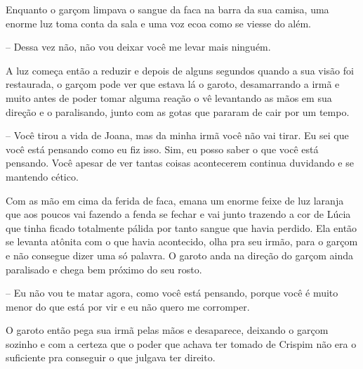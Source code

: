 Enquanto o garçom limpava o sangue da faca na barra da sua camisa, uma enorme luz toma conta da sala e uma voz ecoa como se viesse do além.

-- Dessa vez não, não vou deixar você me levar mais ninguém.

A luz começa então a reduzir e depois de alguns segundos quando a sua visão foi restaurada, o garçom pode ver que estava lá o garoto, desamarrando a irmã e muito antes de poder tomar alguma reação o vê levantando as mãos em sua direção e o paralisando, junto com as gotas que pararam de cair por um tempo.

-- Você tirou a vida de Joana, mas da minha irmã você não vai tirar. Eu sei que você está pensando como eu fiz isso. Sim, eu posso saber o que você está pensando. Você apesar de ver tantas coisas acontecerem continua duvidando e se mantendo cético.

Com as mão em cima da ferida de faca, emana um enorme feixe de luz laranja que aos poucos vai fazendo a fenda se fechar e vai junto trazendo a cor de Lúcia que tinha ficado totalmente pálida por tanto sangue que havia perdido. Ela então se levanta atônita com o que havia acontecido, olha pra seu irmão, para o garçom e não consegue dizer uma só palavra. O garoto anda na direção do garçom ainda paralisado e chega bem próximo do seu rosto.

-- Eu não vou te matar agora, como você está pensando, porque você é muito menor do que está por vir e eu não quero me corromper. 

O garoto então pega sua irmã pelas mãos e desaparece, deixando o garçom sozinho e com a certeza que o poder que achava ter tomado de Crispim não era o suficiente pra conseguir o que julgava ter direito.

